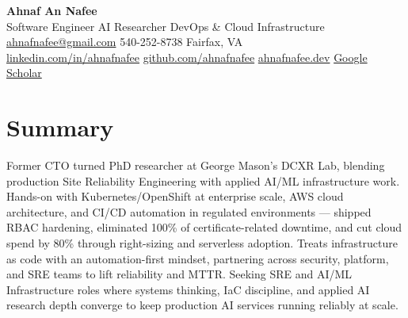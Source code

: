 \documentclass[letterpaper,10pt]{article}
\begin{document}
\begin{center}
  {\LARGE\bfseries\color{accent} Ahnaf An Nafee }\\[3pt]
  {\normalsize Software Engineer \textbar{} AI Researcher \textbar{} DevOps \& Cloud Infrastructure }\\[4pt]
  \small
  \href{mailto:ahnafnafee@gmail.com}{ahnafnafee@gmail.com} \textbar{}
  540-252-8738 \textbar{}
  Fairfax, VA\\
  \href{https://linkedin.com/in/ahnafnafee}{linkedin.com/in/ahnafnafee} \textbar{}
  \href{https://github.com/ahnafnafee}{github.com/ahnafnafee} \textbar{}
  \href{https://www.ahnafnafee.dev}{ahnafnafee.dev} \textbar{} \href{https://scholar.google.com/citations?user=u15DO0cAAAAJ}{Google Scholar}
\end{center}

\section*{Summary}
Former CTO turned PhD researcher at George Mason's DCXR Lab, blending production Site Reliability Engineering with applied AI/ML infrastructure work. Hands-on with Kubernetes/OpenShift at enterprise scale, AWS cloud architecture, and CI/CD automation in regulated environments --- shipped RBAC hardening, eliminated 100\% of certificate-related downtime, and cut cloud spend by 80\% through right-sizing and serverless adoption. Treats infrastructure as code with an automation-first mindset, partnering across security, platform, and SRE teams to lift reliability and MTTR. Seeking SRE and AI/ML Infrastructure roles where systems thinking, IaC discipline, and applied AI research depth converge to keep production AI services running reliably at scale.

\end{document}
